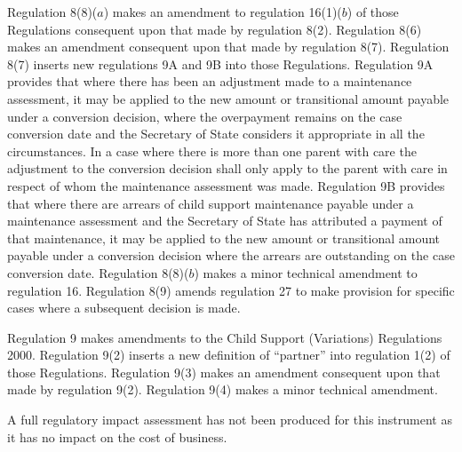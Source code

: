 \documentclass[12pt,a4paper]{article}
\begin{document}
Regulation 8(8)($a$)  makes an amendment to regulation 16(1)($b$)  of those Regulations consequent upon that made by regulation 8(2). Regulation 8(6) makes an amendment consequent upon that made by regulation 8(7). Regulation 8(7) inserts new regulations 9A and 9B into those Regulations. Regulation 9A provides that where there has been an adjustment made to a maintenance assessment, it may be applied to the new amount or transitional amount payable under a conversion decision, where the overpayment remains on the case conversion date and the Secretary of State considers it appropriate in all the circumstances. In a case where there is more than one parent with care the adjustment to the conversion decision shall only apply to the parent with care in respect of whom the maintenance assessment was made. Regulation 9B provides that where there are arrears of child support maintenance payable under a maintenance assessment and the Secretary of State has attributed a payment of that maintenance, it may be applied to the new amount or transitional amount payable under a conversion decision where the arrears are outstanding on the case conversion date. Regulation 8(8)($b$)  makes a minor technical amendment to regulation 16. Regulation 8(9) amends regulation 27 to make provision for specific cases where a subsequent decision is made.

Regulation 9 makes amendments to the Child Support (Variations) Regulations 2000. Regulation 9(2) inserts a new definition of “partner” into regulation 1(2) of those Regulations. Regulation 9(3) makes an amendment consequent upon that made by regulation 9(2). Regulation 9(4) makes a minor technical amendment.

A full regulatory impact assessment has not been produced for this instrument as it has no impact on the cost of business. 
\end{document}
